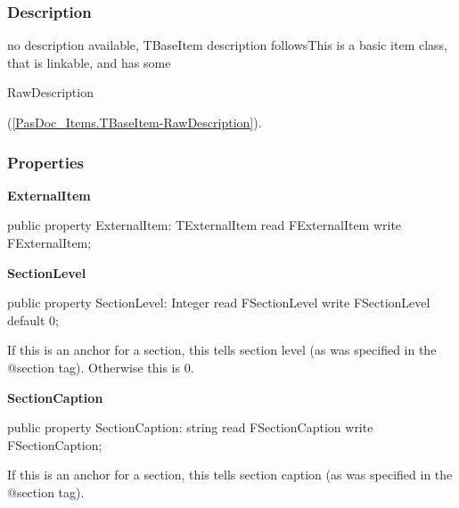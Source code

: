 \documentclass{report}
\newif\ifpdf
\begin{document}
\subsubsection*{\large{\textbf{Description}}\normalsize\hspace{1ex}\hfill}
no description available, TBaseItem description followsThis is a basic item class, that is linkable, and has some \begin{ttfamily}RawDescription\end{ttfamily}(\ref{PasDoc_Items.TBaseItem-RawDescription}).\subsubsection*{\large{\textbf{Properties}}\normalsize\hspace{1ex}\hfill}
\begin{list}{}{
\setlength{\itemindent}{0cm}
\setlength{\listparindent}{0cm}
\setlength{\leftmargin}{\evensidemargin}
\addtolength{\leftmargin}{\tmplength}
\settowidth{\labelsep}{X}
\addtolength{\leftmargin}{\labelsep}
\setlength{\labelwidth}{\tmplength}
}
\label{PasDoc_Items.TAnchorItem-ExternalItem}
\item[\textbf{ExternalItem}\hfill]
\ifpdf
\begin{flushleft}
\fi
\begin{ttfamily}
public property ExternalItem: TExternalItem read FExternalItem write FExternalItem;\end{ttfamily}

\ifpdf
\end{flushleft}
\fi


\par  \label{PasDoc_Items.TAnchorItem-SectionLevel}
\item[\textbf{SectionLevel}\hfill]
\ifpdf
\begin{flushleft}
\fi
\begin{ttfamily}
public property SectionLevel: Integer
      read FSectionLevel write FSectionLevel default 0;\end{ttfamily}

\ifpdf
\end{flushleft}
\fi


\par If this is an anchor for a section, this tells section level (as was specified in the @section tag). Otherwise this is 0.\label{PasDoc_Items.TAnchorItem-SectionCaption}
\item[\textbf{SectionCaption}\hfill]
\ifpdf
\begin{flushleft}
\fi
\begin{ttfamily}
public property SectionCaption: string
      read FSectionCaption write FSectionCaption;\end{ttfamily}

\ifpdf
\end{flushleft}
\fi


\par If this is an anchor for a section, this tells section caption (as was specified in the @section tag).\end{list}
\ifpdf
\end{document}
